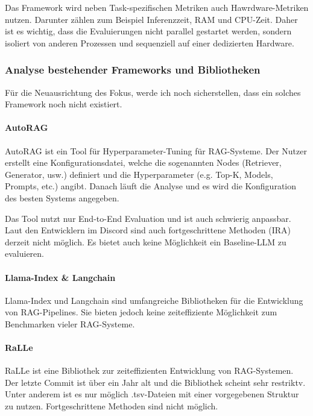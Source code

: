 \documentclass[letterpaper, 10 pt, conference]{ieeeconf}
\begin{document}
Das Framework wird neben Task-spezifischen Metriken auch Hawrdware-Metriken nutzen. Darunter zählen zum Beispiel Inferenzzeit, RAM und CPU-Zeit. 
Daher ist es wichtig, dass die Evaluierungen nicht parallel gestartet werden, sondern isoliert von anderen Prozessen und sequenziell auf einer dedizierten Hardware. \\

\subsubsection{Analyse bestehender Frameworks und Bibliotheken}

Für die Neuausrichtung des Fokus, werde ich noch sicherstellen, dass ein solches Framework noch nicht existiert.\\

\paragraph{AutoRAG\cite{AutoRAG}}
AutoRAG ist ein Tool für Hyperparameter-Tuning für RAG-Systeme. Der Nutzer erstellt eine Konfigurationsdatei, welche 
die sogenannten Nodes (Retriever, Generator, usw.) definiert und die Hyperparameter (e.g. Top-K, Models, Prompts, etc.) angibt. 
Danach läuft die Analyse und es wird die Konfiguration des besten Systems angegeben. 

Das Tool nutzt nur End-to-End Evaluation und ist auch schwierig anpassbar. Laut den Entwicklern im Discord sind auch fortgeschrittene Methoden (IRA) derzeit nicht möglich. 
Es bietet auch keine Möglichkeit ein Baseline-LLM zu evaluieren. \\

\paragraph{Llama-Index\cite{Liu_LlamaIndex_2022} \& Langchain\cite{Chase_LangChain_2022}}
Llama-Index und Langchain sind umfangreiche Bibliotheken für die Entwicklung von RAG-Pipelines. 
Sie bieten jedoch keine zeiteffiziente Möglichkeit zum Benchmarken vieler RAG-Systeme.\\

\paragraph{RaLLe\cite{ralle}}
RaLLe ist eine Bibliothek zur zeiteffizienten Entwicklung von RAG-Systemen. Der letzte Commit ist über ein Jahr alt und die Bibliothek scheint sehr restriktv. Unter anderem ist es nur möglich .tsv-Dateien mit einer vorgegebenen Struktur zu nutzen. Fortgeschrittene Methoden sind nicht möglich.\\
\end{document}
